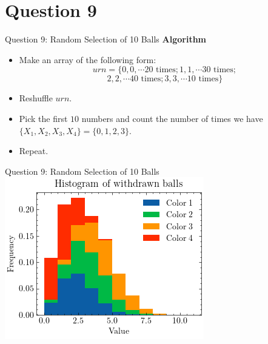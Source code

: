 \documentclass[compress,12pt]{beamer}
\begin{document}


\section{Question 9}
\begin{frame}{Question 9: Random Selection of 10 Balls}
    \textbf{Algorithm}
    \begin{itemize}
        \item Make an array of the following form:
$$urn=\{0,0,\cdots \text{20 times};1,1,\cdots \text{30 times};$$
$$2,2,\cdots \text{40 times};3,3,\cdots  \text{10 times}\}$$
        \item Reshuffle $urn$.
        \item Pick the first $10$ numbers and count the number of times we have $\{X_1,X_2,X_3,X_4\}=\{0,1,2,3\}.$
        \item Repeat.
    \end{itemize}
\end{frame}
\begin{frame}{Question 9: Random Selection of 10 Balls}
\centering
\includegraphics[scale=0.3]{imgs/balls.png}  
\end{frame}
\end{document}
